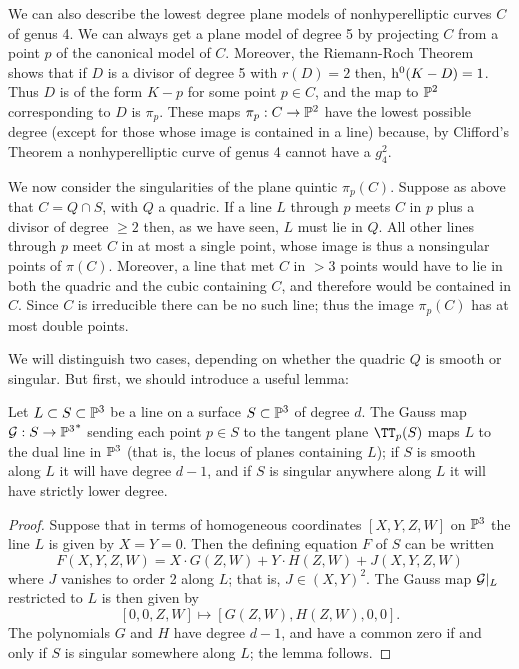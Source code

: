 We can also describe the lowest degree plane models of nonhyperelliptic curves $C$ of genus 4. 
We can always get a plane model of degree 5 by projecting $C$ from a point $p$ of the canonical model of $C$. Moreover, the Riemann-Roch Theorem shows that if $D$ is a divisor of degree 5 with $r(D)=2$ then,  $\h^0(K-D) = 1$. Thus $D$ is of the form $K-p$ for some point $p \in C$, and the map to $\PP^2$ corresponding to $D$ is $\pi_p$. These  maps $\pi_p: C\to \PP^2$ have the lowest possible degree (except for those whose image is  contained in a line) because, by Clifford's Theorem a nonhyperelliptic curve of genus 4 cannot have a $g^2_4$.

We now consider the singularities of the plane quintic $\pi_p(C)$. Suppose as above that $C = Q\cap S$, with $Q$ a quadric. If a line $L$ through $p$ meets $C$ in $p$ plus a divisor of degree $\geq 2$ then, as we have seen, $L$ must lie in $Q$.  All other lines through $p$ meet $C$ in at most a single point,  whose image is thus a nonsingular points of $\pi(C)$. Moreover, a line that met $C$ in $>3$ points would have to lie in both the quadric and the cubic containing $C$, and therefore would be contained in $C$. Since $C$ is irreducible there can be no such line; thus the image $\pi_p(C)$ has at most double points.

We will distinguish two cases, depending on whether the quadric $Q$ is smooth or singular. But first, we should introduce a useful lemma:

\begin{lemma}
Let $L \subset S \subset \PP^3$ be a line on a surface $S \subset \PP^3$ of degree $d$. The Gauss map $\cG : S \to {\PP^3}^*$ sending each point $p \in S$ to the tangent plane $\TT_p(S)$ maps $L$ to the dual line in $\PP^3$ (that is, the locus of planes containing $L$); if $S$ is smooth along $L$ it will have degree $d-1$, and if $S$ is singular anywhere along $L$ it will have strictly lower degree.
\end{lemma}

\begin{proof}
Suppose that in terms of homogeneous coordinates $[X,Y,Z,W]$ on $\PP^3$ the line $L$ is given by $X = Y = 0$. Then the defining equation $F$ of $S$ can be written
$$
F(X,Y,Z,W) = X\cdot G(Z,W) + Y\cdot H(Z,W) + J(X,Y,Z,W)
$$
where $J$ vanishes to order 2 along $L$; that is, $J \in (X,Y)^2$. The Gauss map $\cG|_L$ restricted to $L$ is then given by
$$
[0,0,Z,W] \mapsto [G(Z,W), H(Z,W), 0, 0].
$$
The polynomials $G$ and $H$ have degree $d-1$, and have a common zero if and only if $S$ is singular somewhere along $L$; the lemma follows.
\end{proof}

